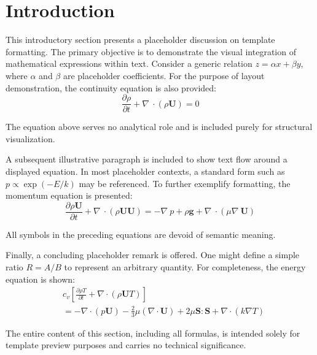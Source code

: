 \documentclass{JHD}
\begin{document}
\section{Introduction}
This introductory section presents a placeholder discussion on template formatting. The primary objective is to demonstrate the visual integration of mathematical expressions within text. Consider a generic relation $z = \alpha x + \beta y$, where $\alpha$ and $\beta$ are placeholder coefficients. For the purpose of layout demonstration, the continuity equation is also provided:
\begin{equation}
 \frac{\partial \rho }{\partial t} +\nabla\ \cdot (\rho \bm U)=0
\end{equation}
\par
The equation above serves no analytical role and is included purely for structural visualization.
\par
A subsequent illustrative paragraph is included to show text flow around a displayed equation. In most placeholder contexts, a standard form such as $p \propto \exp(-E/k)$ may be referenced. To further exemplify formatting,  the momentum equation is presented:
\begin{equation}
 \frac{\partial \rho \bm U}{\partial t} + \nabla\ \cdot (\rho \bm U  \bm U) = -\nabla\ p + \rho \bm g + \nabla\ \cdot (\mu \nabla\  \bm U )
\end{equation}
\par

All symbols in the preceding equations are devoid of semantic meaning.
\par
Finally, a concluding placeholder remark is offered. One might define a simple ratio $R = A/B$ to represent an arbitrary quantity. For completeness, the energy equation is shown:
\begin{equation}
	\begin{split}
		&  c_v[\frac{\partial\rho T}{\partial t} + \nabla \cdot (\rho \bm U T)]\\
		& = -  \nabla \cdot (p \bm U )-\frac{2}{3} \mu ( \nabla \cdot \bm U )+2 \mu \bm S : \bm S +  \nabla \cdot (k \nabla T )
	\end{split}
\end{equation}
\par
The entire content of this section, including all formulas, is intended solely for template preview purposes and carries no technical significance.
\end{document}
